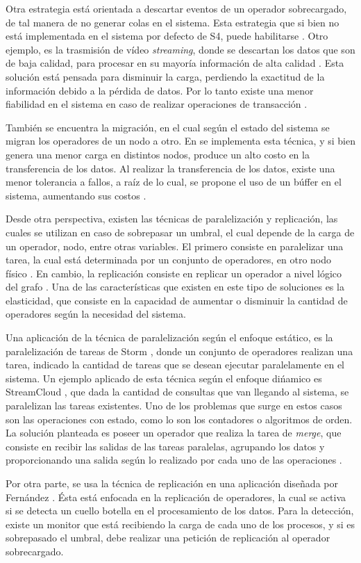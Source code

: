 Otra estrategia está orientada a descartar eventos de un operador sobrecargado, de tal manera de no generar colas en el sistema. Esta estrategia que si bien no está implementada en el sistema por defecto de S4, puede habilitarse \cite{s4}. Otro ejemplo, es la trasmisión de vídeo \textsl{streaming}, donde se descartan los datos que son de baja calidad, para procesar en su mayoría información de alta calidad \cite{SheuC09}. Esta solución está pensada para disminuir la carga, perdiendo la exactitud de la información debido a la pérdida de datos. Por lo tanto existe una menor fiabilidad en el sistema en caso de realizar operaciones de transacción \cite{bookDistrSys}.

También se encuentra la migración, en el cual según el estado del sistema se migran los operadores de un nodo a otro. En \cite{XingZH05} se implementa   esta técnica, y si bien genera una menor carga en distintos nodos, produce un alto costo en la transferencia de los datos. Al realizar la transferencia de los datos, existe una menor tolerancia a fallos, a raíz de lo cual, se propone el uso de un búffer en el sistema, aumentando sus costos \cite{PittauACA07}.

Desde otra perspectiva, existen las técnicas de paralelización y replicación, las cuales se utilizan en caso de sobrepasar un umbral, el cual depende de la carga de un operador, nodo, entre otras variables. El primero consiste en paralelizar una tarea, la cual está determinada por un conjunto de operadores, en otro nodo físico \cite{IshiiS11}. En cambio, la replicación consiste en replicar un operador a nivel lógico del grafo \cite{MadsenTZ14}. Una de las características que existen en este tipo de soluciones es la elasticidad, que consiste en la capacidad de aumentar o disminuir la cantidad de operadores según la necesidad del sistema.

Una aplicación de la técnica de paralelización según el enfoque estático, es la paralelización de tareas de Storm \cite{stormtwitterdoc}, donde un conjunto de operadores realizan una tarea, indicado la cantidad de tareas que se desean ejecutar paralelamente en el sistema. Un ejemplo aplicado de esta técnica según el enfoque dińamico es StreamCloud \cite{GulisanoJPSV12}, que dada la cantidad de consultas que van llegando al sistema, se paralelizan las tareas existentes. Uno de los problemas que surge en estos casos son las operaciones con estado, como lo son los contadores o algoritmos de orden. La solución planteada es poseer un operador que realiza la tarea de \textsl{merge}, que consiste en recibir las salidas de las tareas paralelas, agrupando los datos y proporcionando una salida según lo realizado por cada uno de las operaciones \cite{GedikSHW14}.

Por otra parte, se usa la técnica de replicación en una aplicación diseñada por Fernández \cite{FernandezMKP13}. Ésta está enfocada en la replicación de operadores, la cual se activa si se detecta un cuello botella en el procesamiento de los datos. Para la detección, existe un monitor que está recibiendo la carga de cada uno de los procesos, y si es sobrepasado el umbral, debe realizar una petición de replicación al operador sobrecargado.